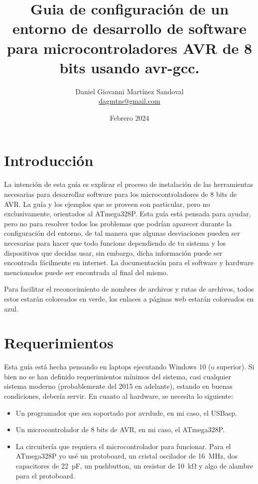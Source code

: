 \documentclass[10pt,letterpaper]{article}
\title{Guia de configuración de un entorno de desarrollo de software para microcontroladores AVR de 8 bits usando avr-gcc.}
\author{Daniel Giovanni Martínez Sandoval\\ \small{\href{mailto:dagmtzs@gmail.com}{dagmtzs@gmail.com}}}
\date{Febrero 2024}
\begin{document}
\maketitle
\newpage
\tableofcontents	

\section{Introducción}
La intención de esta guía es explicar el proceso de instalación de las herramientas necesarias para desarrollar software para los microcontroladores de 8 bits de AVR. La guía y los ejemplos que se proveen son particular, pero no exclusivamente, orientados al ATmega328P. Esta guía está pensada para ayudar, pero no para resolver todos los problemas que podrían aparecer durante la configuración del entorno, de tal manera que algunas desviaciones pueden ser necesarias para hacer que todo funcione dependiendo de tu sistema y los dispositivos que decidas usar, sin embargo, dicha información puede ser encontrada fácilmente en internet. La documentación para el software y hardware mencionados puede ser encontrada al final del mismo.

Para facilitar el reconocimiento de nombres de archivos y rutas de archivos, todos estos estarán coloreados en {\color{ForestGreen}verde}, los enlaces a páginas web estarán coloreados en {\color{blue}azul}.

\section{Requerimientos}
Esta guía está hecha pensando en laptops ejecutando Windows 10 (o superior). Si bien no se han definido requerimientos mínimos del sistema, casi cualquier sistema moderno (probablemente del 2015 en adelante), estando en buenas condiciones, debería servir. En cuanto al hardware, se necesita lo siguiente:
\begin{itemize}
    \item Un programador que sea soportado por avrdude, en mi caso, el USBasp.
    \item Un microcontrolador de 8 bits de AVR, en mi caso, el ATmega328P.
    \item La circuitería que requiera el microcontrolador para funcionar. Para el ATmega328P yo usé un protoboard, un cristal oscilador de \SI{16}{\mega\hertz}, dos capacitores de \SI{22}{\pico\farad}, un pushbutton, un resistor de \SI{10}{\kilo\ohm} y algo de alambre para el protoboard.
\end{itemize}
\end{document}
